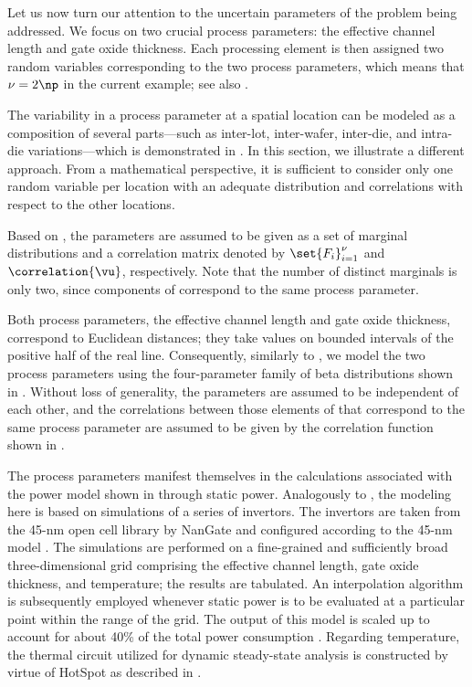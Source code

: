 Let us now turn our attention to the uncertain parameters \vu of the problem
being addressed. We focus on two crucial process parameters: the effective
channel length and gate oxide thickness. Each processing element is then
assigned two random variables corresponding to the two process parameters, which
means that $\nu = 2 \np$ in the current example; see also .

\begin{remark}
The variability in a process parameter at a spatial location can be modeled as a
composition of several parts---such as inter-lot, inter-wafer, inter-die, and
intra-die variations---which is demonstrated in
. In this section, we illustrate a different
approach. From a mathematical perspective, it is sufficient to consider only one
random variable per location with an adequate distribution and correlations with
respect to the other locations.
\end{remark}

Based on , the parameters \vu are assumed to be given as
a set of marginal distributions and a correlation matrix denoted by
$\set{F_i}_{i = 1}^\nu$ and $\correlation{\vu}$, respectively. Note that the
number of distinct marginals is only two, since \np components of \vu correspond
to the same process parameter.

Both process parameters, the effective channel length and gate oxide thickness,
correspond to Euclidean distances; they take values on bounded intervals of the
positive half of the real line. Consequently, similarly to
, we model the two process parameters using
the four-parameter family of beta distributions shown in
. Without loss of generality, the parameters are assumed
to be independent of each other, and the correlations between those elements of
\vu that correspond to the same process parameter are assumed to be given by the
correlation function shown in .

The process parameters manifest themselves in the calculations associated with
the power model shown in  through static power.
Analogously to , the modeling here is based on
 simulations of a series of  invertors. The invertors are
taken from the 45-nm open cell library by NanGate \cite{nangate} and configured
according to the 45-nm   model \cite{ptm}. The simulations are
performed on a fine-grained and sufficiently broad three-dimensional grid
comprising the effective channel length, gate oxide thickness, and temperature;
the results are tabulated. An interpolation algorithm is subsequently employed
whenever static power is to be evaluated at a particular point within the range
of the grid. The output of this model is scaled up to account for about 40\% of
the total power consumption \cite{liu2007}. Regarding temperature, the thermal
 circuit utilized for dynamic steady-state analysis is constructed by
virtue of HotSpot \cite{skadron2003} as described in .

